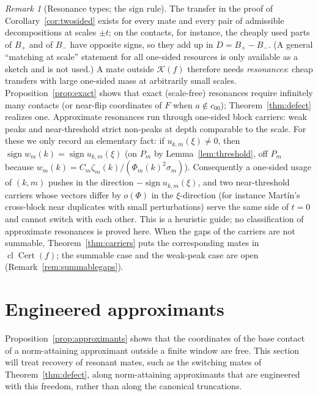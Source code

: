 \documentclass[10pt]{amsart}
\theoremstyle{definition}
\theoremstyle{remark}
\newtheorem{remark}[theorem]{Remark}
\newcommand{\sgn}{\operatorname{sign}}
\newcommand{\Cert}{\operatorname{Cert}}
\newcommand{\cl}{\operatorname{cl}}
\begin{document}
\begin{remark}[Resonance types; the sign rule]\label{rem:resonancetypes}
The transfer in the proof of Corollary~\ref{cor:twosided} exists for every
mate and every pair of admissible decompositions at scales $\pm t$; on the
contacts, for instance, the cheaply used parts of $B_+$ and of $B_-$ have
opposite signs, so they add up in $D=B_+-B_-$.  (A general ``matching at
scale'' statement for all one-sided resources is only available as a
sketch and is not used.)  A mate outside $\mathcal
K(f)$ therefore needs \emph{resonances}: cheap transfers with large
one-sided mass at arbitrarily small scales.  Proposition~\ref{prop:exact}
shows that exact (scale-free) resonances require infinitely many contacts
(or near-flip coordinates of $F$ when $a\notin c_{00}$);
Theorem~\ref{thm:defect} realizes one.  Approximate resonances run through
one-sided block carriers: weak peaks and near-threshold strict non-peaks
at depth comparable to the scale.  For these we only record an elementary
fact: if $u_{k,m}(\xi)\ne0$, then $\sgn w_m(k)=\sgn u_{k,m}(\xi)$ (on $P_m$
by Lemma~\ref{lem:threshold}, off $P_m$ because $w_m(k)=C_m\zeta_m(k)/
(\Phi_m(k)^2\sigma_m)$).  Consequently a one-sided usage of $(k,m)$ pushes in
the direction $-\sgn u_{k,m}(\xi)$, and two near-threshold carriers whose
vectors differ by $o(\Phi)$ in the $\xi$-direction (for instance Mart\'in's
cross-block near duplicates with small perturbations) serve the same side
of $t=0$ and cannot switch with each other.  This is a heuristic guide; no
classification of approximate resonances is proved here.  When the gaps of
the carriers are not summable, Theorem~\ref{thm:carriers} puts the
corresponding mates in $\cl\Cert(f)$; the summable case and the weak-peak
case are open (Remark~\ref{rem:summablegaps}).
\end{remark}

\section{Engineered approximants}\label{sec:engineered}

Proposition~\ref{prop:approximants} shows that the coordinates of the base
contact of a norm-attaining approximant outside a finite window are free.
This section will treat recovery of resonant mates, such as the switching
mates of Theorem~\ref{thm:defect}, along norm-attaining approximants that are
engineered with this freedom, rather than along the canonical truncations.

\end{document}
